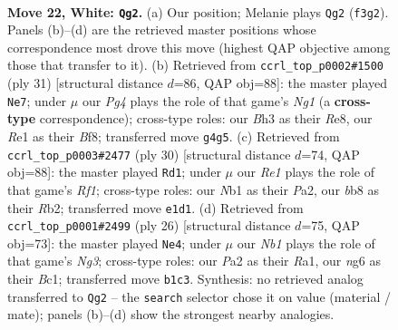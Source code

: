 \documentclass[11pt]{article}
\begin{document}
\clearpage

\begin{figure}[p]\centering
\begin{subfigure}{0.46\textwidth}\centering
\resizebox{\linewidth}{!}{%
\newchessgame
\chessboard[
  setfen={rb2r1k1/1p1b1ppp/pq2p1n1/8/3p2P1/1P3Q1B/P2P1P1P/RNB1RK2 w - - 0 22},
  showmover=false,
  pgfstyle=straightmove, color=movearrow, markmove={f3-g2}
]}
\caption{}
\end{subfigure}\hfill
\begin{subfigure}{0.46\textwidth}\centering
\resizebox{\linewidth}{!}{%
\newchessgame
\chessboard[
  setfen={2k1rbnr/1pp4p/p1p1qp2/6p1/4P3/N4Q1P/PPP2PPB/R3R1K1 b - - 1 16},
  showmover=false,
  pgfstyle=straightmove, color=movearrow, markmove={g8-e7}
]}
\caption{}
\end{subfigure}
\\[4pt]
\begin{subfigure}{0.46\textwidth}\centering
\resizebox{\linewidth}{!}{%
\newchessgame
\chessboard[
  setfen={rn1r2k1/p4p1p/3p1qp1/2p2p2/2P1bN2/2P1P3/PR1QBPPP/5RK1 w - - 6 16},
  showmover=false,
  pgfstyle=straightmove, color=movearrow, markmove={f1-d1}
]}
\caption{}
\end{subfigure}\hfill
\begin{subfigure}{0.46\textwidth}\centering
\resizebox{\linewidth}{!}{%
\newchessgame
\chessboard[
  setfen={rnb2rk1/pp3pbp/1q4p1/2pQ4/8/5BN1/PPP2PPP/R1B2RK1 w - - 1 14},
  showmover=false,
  pgfstyle=straightmove, color=movearrow, markmove={g3-e4}
]}
\caption{}
\end{subfigure}
\caption{\textbf{Move 22, White: \texttt{Qg2}.} (a) Our position; Melanie plays \texttt{Qg2} (\texttt{f3g2}). Panels (b)--(d) are the retrieved master positions whose correspondence most drove this move (highest QAP objective among those that transfer to it). (b) Retrieved from \texttt{ccrl\_top\_p0002\#1500} (ply 31) [structural distance $d$=86, QAP obj=88]: the master played \texttt{Ne7}; under $\mu$ our \emph{Pg4} plays the role of that game's \emph{Ng1} (a \textbf{cross-type} correspondence); cross-type roles: our \emph{B}h3 as their \emph{R}e8, our \emph{R}e1 as their \emph{B}f8; transferred move \texttt{g4g5}. (c) Retrieved from \texttt{ccrl\_top\_p0003\#2477} (ply 30) [structural distance $d$=74, QAP obj=88]: the master played \texttt{Rd1}; under $\mu$ our \emph{Re1} plays the role of that game's \emph{Rf1}; cross-type roles: our \emph{N}b1 as their \emph{P}a2, our \emph{b}b8 as their \emph{R}b2; transferred move \texttt{e1d1}. (d) Retrieved from \texttt{ccrl\_top\_p0001\#2499} (ply 26) [structural distance $d$=75, QAP obj=73]: the master played \texttt{Ne4}; under $\mu$ our \emph{Nb1} plays the role of that game's \emph{Ng3}; cross-type roles: our \emph{P}a2 as their \emph{R}a1, our \emph{n}g6 as their \emph{B}c1; transferred move \texttt{b1c3}. Synthesis: no retrieved analog transferred to \texttt{Qg2} -- the \texttt{search} selector chose it on value (material / mate); panels (b)--(d) show the strongest nearby analogies.}
\label{fig:thought-m42}
\end{figure}
\end{document}
